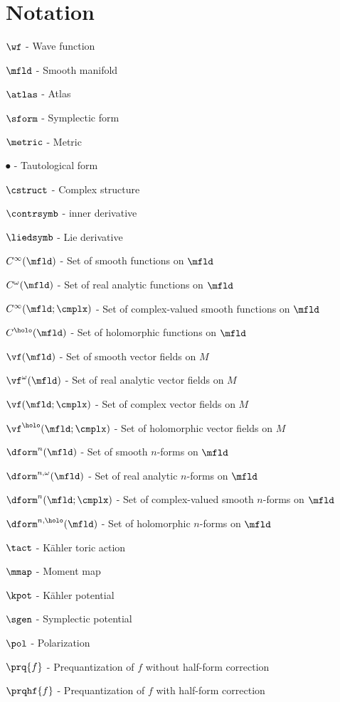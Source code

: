 \documentclass[notas.tex]{subfiles} 				%
\begin{document}
	\chapter*{Notation}
	$\wf$ - Wave function

	$\mfld$ - Smooth manifold

	$\atlas$ - Atlas

	$\sform$ - Symplectic form

	$\metric$ - Metric

	$\spot$ - Tautological form

	$\cstruct$ - Complex structure

	$\contrsymb$ - inner derivative

	$\liedsymb$ - Lie derivative

	$C^\infty(\mfld)$ - Set of smooth functions on $\mfld$

	$C^\omega(\mfld)$ - Set of real analytic functions on $\mfld$

	$C^\infty(\mfld; \cmplx)$ - Set of complex-valued smooth functions on $\mfld$

	$C^\holo(\mfld)$ - Set of holomorphic functions on $\mfld$

	$\vf(\mfld)$ - Set of smooth vector fields on $M$

	$\vf^\omega(\mfld)$ - Set of real analytic vector fields on $M$

	$\vf(\mfld; \cmplx)$ - Set of complex vector fields on $M$

	$\vf^\holo(\mfld; \cmplx)$ - Set of  holomorphic vector fields on $M$

	$\dform^n(\mfld)$ - Set of smooth $n$-forms on $\mfld$
	
	$\dform^{n, \omega}(\mfld)$ - Set of real analytic $n$-forms on $\mfld$
	
	$\dform^{n}(\mfld; \cmplx)$ - Set of complex-valued smooth $n$-forms on $\mfld$
	
	$\dform^{n, \holo}(\mfld)$ - Set of holomorphic $n$-forms on $\mfld$
	
	$\tact$ - Kähler toric action

	$\mmap$ - Moment map

	$\kpot$ - Kähler potential

	$\sgen$ - Symplectic potential
	
	$\pol$ - Polarization

	$\prq{f}$ - Prequantization of $f$ without half-form correction

	$\prqhf{f}$ - Prequantization of $f$ with half-form correction
\end{document}
